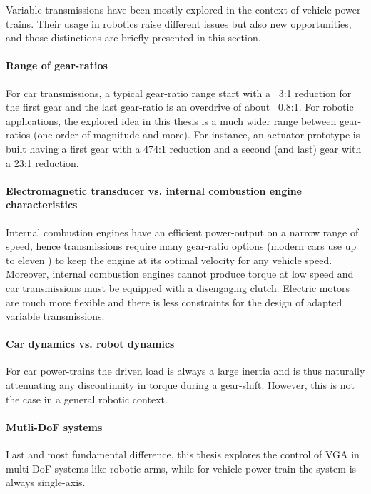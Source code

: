 Variable transmissions have been mostly explored in the context of vehicle power-trains. Their usage in robotics raise different issues but also new opportunities, and those distinctions are briefly presented in this section.

\paragraph{Range of gear-ratios}
%
For car transmissions, a typical gear-ratio range start with a ~3:1 reduction for the first gear and the last gear-ratio is an overdrive of about ~0.8:1. For robotic applications, the explored idea in this thesis is a much wider range between gear-ratios (one order-of-magnitude and more). For instance, an actuator prototype is built having a first gear with a 474:1 reduction and a second (and last) gear with a 23:1 reduction. 


\paragraph{Electromagnetic transducer vs. internal combustion engine characteristics}
%
Internal combustion engines have an efficient power-output on a narrow range of speed, hence transmissions require many gear-ratio options (modern cars use up to eleven \cite{goleski_multi-speed_2015}) to keep the engine at its optimal velocity for any vehicle speed. Moreover, internal combustion engines cannot produce torque at low speed and car transmissions must be equipped with a disengaging clutch.  Electric motors are much more flexible and there is less constraints for the design of adapted variable transmissions. 

\paragraph{Car dynamics vs. robot dynamics}
%
For car power-trains the driven load is always a large inertia and is thus naturally attenuating any discontinuity in torque during a gear-shift. However, this is not the case in a general robotic context. 

\paragraph{Mutli-DoF systems}
%
Last and most fundamental difference, this thesis explores the control of VGA in multi-DoF systems like robotic arms, while for vehicle power-train the system is always single-axis.

